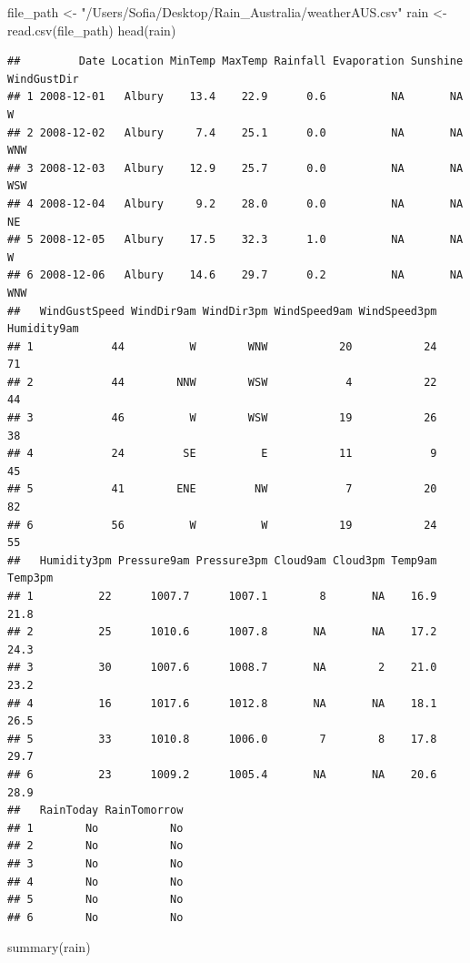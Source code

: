 \documentclass[
]{article}
\newenvironment{Shaded}{\begin{snugshade}}{\end{snugshade}}
\newcommand{\FunctionTok}[1]{\textcolor[rgb]{0.00,0.00,0.00}{#1}}
\newcommand{\NormalTok}[1]{#1}
\newcommand{\OtherTok}[1]{\textcolor[rgb]{0.56,0.35,0.01}{#1}}
\newcommand{\StringTok}[1]{\textcolor[rgb]{0.31,0.60,0.02}{#1}}
\begin{document}
\begin{Shaded}
\begin{Highlighting}[]
\NormalTok{file\_path }\OtherTok{\textless{}{-}} \StringTok{"/Users/Sofia/Desktop/Rain\_Australia/weatherAUS.csv"}
\NormalTok{rain }\OtherTok{\textless{}{-}} \FunctionTok{read.csv}\NormalTok{(file\_path)}
\FunctionTok{head}\NormalTok{(rain)}
\end{Highlighting}
\end{Shaded}

\begin{verbatim}
##         Date Location MinTemp MaxTemp Rainfall Evaporation Sunshine WindGustDir
## 1 2008-12-01   Albury    13.4    22.9      0.6          NA       NA           W
## 2 2008-12-02   Albury     7.4    25.1      0.0          NA       NA         WNW
## 3 2008-12-03   Albury    12.9    25.7      0.0          NA       NA         WSW
## 4 2008-12-04   Albury     9.2    28.0      0.0          NA       NA          NE
## 5 2008-12-05   Albury    17.5    32.3      1.0          NA       NA           W
## 6 2008-12-06   Albury    14.6    29.7      0.2          NA       NA         WNW
##   WindGustSpeed WindDir9am WindDir3pm WindSpeed9am WindSpeed3pm Humidity9am
## 1            44          W        WNW           20           24          71
## 2            44        NNW        WSW            4           22          44
## 3            46          W        WSW           19           26          38
## 4            24         SE          E           11            9          45
## 5            41        ENE         NW            7           20          82
## 6            56          W          W           19           24          55
##   Humidity3pm Pressure9am Pressure3pm Cloud9am Cloud3pm Temp9am Temp3pm
## 1          22      1007.7      1007.1        8       NA    16.9    21.8
## 2          25      1010.6      1007.8       NA       NA    17.2    24.3
## 3          30      1007.6      1008.7       NA        2    21.0    23.2
## 4          16      1017.6      1012.8       NA       NA    18.1    26.5
## 5          33      1010.8      1006.0        7        8    17.8    29.7
## 6          23      1009.2      1005.4       NA       NA    20.6    28.9
##   RainToday RainTomorrow
## 1        No           No
## 2        No           No
## 3        No           No
## 4        No           No
## 5        No           No
## 6        No           No
\end{verbatim}

\begin{Shaded}
\begin{Highlighting}[]
\FunctionTok{summary}\NormalTok{(rain)}
\end{Highlighting}
\end{Shaded}
\end{document}
